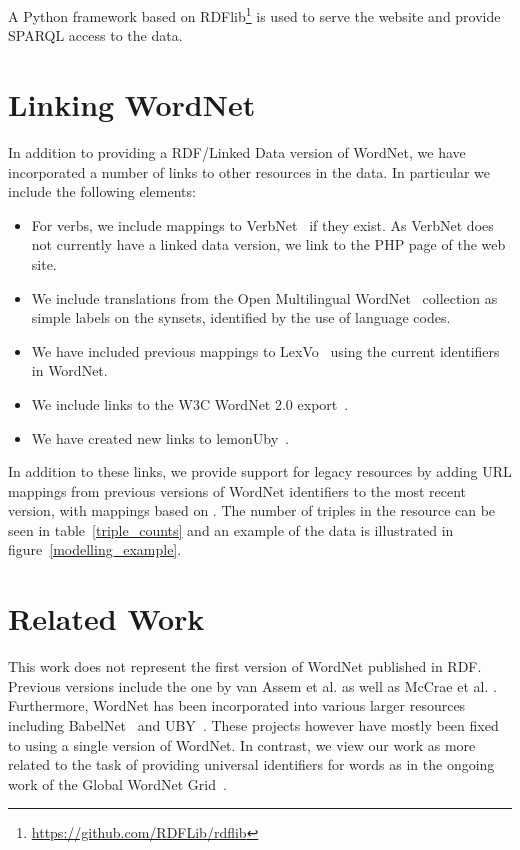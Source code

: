 \documentclass[10pt, a4paper]{article}
\begin{document}
A Python framework based on RDFlib\footnote{\url{https://github.com/RDFLib/rdflib}} is used to serve the website and
provide SPARQL access to the data.

\section{Linking WordNet}

In addition to providing a RDF/Linked Data version of WordNet, we have incorporated a number of links to other resources in the data. In particular
we include the following elements:

\begin{itemize}
  \item For verbs, we include mappings to VerbNet~\cite{schuler2005verbnet} if they exist. As
    VerbNet does not currently have a linked data version, we link to the
    PHP page of the web site.
  \item We include translations from the Open Multilingual WordNet~\cite{bond2013linking}
    collection as simple labels on the synsets, identified by the use of
    language codes.
  \item We have included previous mappings to LexVo~\cite{de2008language} 
    using the current identifiers in WordNet.
  \item We include links to the W3C WordNet 2.0 export~\cite{van2006conversion}.
  \item We have created new links to lemonUby~\cite{eckle2014lemonuby}.
\end{itemize}

In addition to these links, we provide support for legacy resources by
adding URL mappings from previous versions of WordNet identifiers to the most
recent version, with mappings based on \cite{daude2000mapping}. The number of
triples in the resource can be seen in table~\ref{triple_counts} and an example
of the data is illustrated in figure~\ref{modelling_example}.

\section{Related Work}

This work does not represent the first version of WordNet published in RDF. Previous versions
include the one by van Assem et al. \cite{van2006conversion} as well as McCrae et al. \cite{mccrae2012integrating}. Furthermore, WordNet has been
incorporated into various larger resources including
BabelNet~\cite{navigli2010babelnet,ehrmann2014} and 
UBY~\cite{gurevych2012uby,eckle2014lemonuby}. These projects however have mostly
been fixed to using a single version of WordNet. In contrast, we view our work
as more related to the task of providing universal identifiers for words as in the
ongoing work of the Global WordNet Grid~\cite{pease2008building}.  
\end{document}
